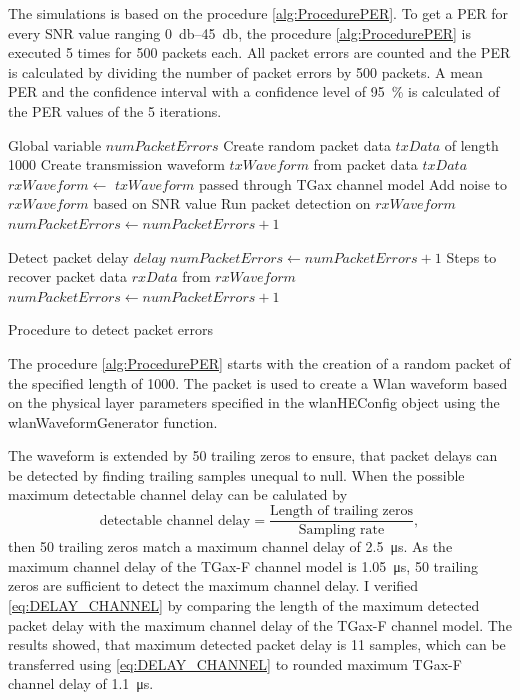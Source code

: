 The simulations is based on the procedure \autoref{alg:ProcedurePER}.
To get a \ac{PER} for every \ac{SNR} value ranging \SIrange{0}{45}{\decibel}, the procedure \autoref{alg:ProcedurePER} is executed \num{5} times for \num{500} packets each.
All packet errors are counted and the \ac{PER} is calculated by dividing the number of packet errors by \num{500} packets.
A mean \ac{PER} and the confidence interval with a confidence level of
\SI{95}{\percent} is calculated of the \ac{PER} values of the \num{5} iterations.
\begin{algorithm}
\begin{algorithmic}[1]
\REQUIRE Global variable $numPacketErrors$
\STATE Create random packet data $txData$ of length \SI{1000}{\byte}
\STATE Create transmission waveform $txWaveform$ from packet data $txData$
\STATE $rxWaveform \gets $ $txWaveform$ passed through TGax channel model
\STATE Add noise to $rxWaveform$ based on \ac{SNR} value
\STATE Run packet detection on $rxWaveform$
    \STATE $numPacketErrors \gets numPacketErrors + 1$
\ENDIF

\STATE Detect packet delay $delay$
    \STATE $numPacketErrors \gets numPacketErrors + 1$
\ENDIF
\STATE Steps to recover packet data $rxData$ from $rxWaveform$
    \STATE $numPacketErrors \gets numPacketErrors + 1$
\ENDIF
\end{algorithmic}
\caption{Procedure to detect packet errors}
\label{alg:ProcedurePER}
\end{algorithm}

The procedure \autoref{alg:ProcedurePER} starts with the creation of a random packet of the specified length of \SI{1000}{\byte}.
The packet is used to create a Wlan waveform based on the physical layer parameters specified in the wlanHEConfig object using the wlanWaveformGenerator function.

The waveform is extended by
\num{50} trailing zeros to ensure, that packet delays can be detected by finding trailing samples unequal to null.
When the possible maximum detectable channel delay can be calulated by
\begin{equation}\label{eq:DELAY_CHANNEL}
	\text{detectable channel delay} =
	\frac{
		\text{Length of trailing zeros}
	}{
		\text{Sampling rate}
	}
	,
\end{equation}
then \num{50} trailing zeros match a maximum channel delay of \SI{2.5}{\micro\second}.
As the maximum channel delay of the TGax-F channel model is \SI{1.05}{\micro\second},
\num{50} trailing zeros are sufficient to detect the maximum channel delay.
I verified \autoref{eq:DELAY_CHANNEL} by comparing
the length of the maximum detected packet delay with the maximum channel delay of the TGax-F channel model.
The results showed, that maximum detected packet delay is \num{11} samples,
which can be transferred using \autoref{eq:DELAY_CHANNEL} to rounded maximum TGax-F channel delay of \SI{1.1}{\micro\second}.

